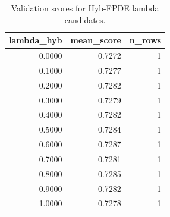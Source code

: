 \begin{table}[t]
\caption{Validation scores for Hyb-FPDE lambda candidates.}
\label{tab:lambda_distribution_computed}
\centering
\begin{tabular}{rrr}
\toprule
lambda\_hyb & mean\_score & n\_rows \\
\midrule
0.0000 & 0.7272 & 1 \\
0.1000 & 0.7277 & 1 \\
0.2000 & 0.7282 & 1 \\
0.3000 & 0.7279 & 1 \\
0.4000 & 0.7282 & 1 \\
0.5000 & 0.7284 & 1 \\
0.6000 & 0.7287 & 1 \\
0.7000 & 0.7281 & 1 \\
0.8000 & 0.7285 & 1 \\
0.9000 & 0.7282 & 1 \\
1.0000 & 0.7278 & 1 \\
\bottomrule
\end{tabular}

\end{table}
